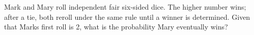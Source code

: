 Mark and Mary roll independent fair six-sided dice. The higher number wins; after a tie, both reroll under the same rule until a winner is determined. Given that Mark\textquotesingle s first roll is 2, what is the probability Mary eventually wins?
